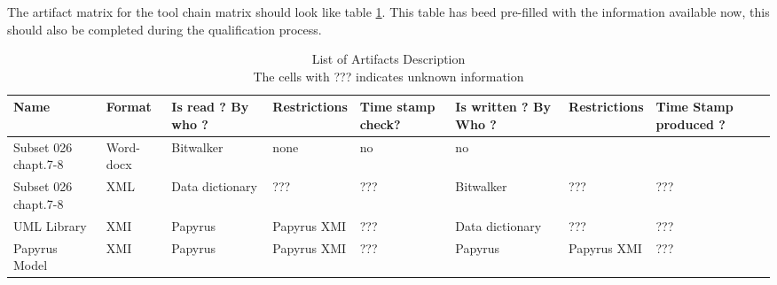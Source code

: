 The artifact matrix for the tool chain matrix should look like
table \ref{tbl:example-artifacts}.
This table has beed pre-filled with the information available now,
this should also be completed during the qualification process.
\begin{table}[htbp]
\caption{\label{tbl:example-artifacts} List of  Artifacts Description\\ The
cells with ??? indicates unknown information\\ }
{\small
\begin{tabular}{|p{4em}|l|p{1.5cm}|l|p{5em}|p{1.8cm}|l|p{5em}|}\hline
Name & Format & Is read ? By who ?& Restrictions & Time stamp check? &Is
written ? By Who ?& Restrictions & Time Stamp produced ?\\\hline
Subset 026 chapt.7-8 & Word-docx & Bitwalker & none & no & no &
&\\\hline
Subset 026 chapt.7-8 & XML  & 
Data dictionary &  ??? & ??? & Bitwalker & ??? & ??? \\\hline
UML Library & XMI & Papyrus & Papyrus XMI & ??? & Data dictionary &
??? & ??? \\\hline 
Papyrus Model & XMI & Papyrus & Papyrus XMI & ??? & Papyrus &
 Papyrus XMI & ??? \\\hline 

\end{tabular}

}
\end{table}

